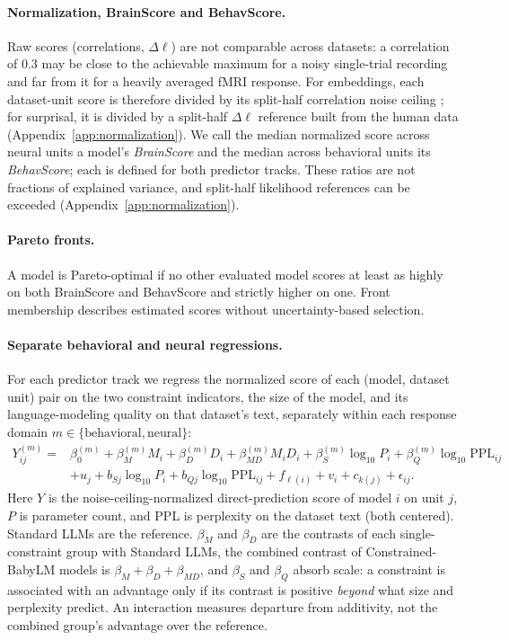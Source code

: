 \paragraph{Normalization, BrainScore and BehavScore.}
Raw scores (correlations, $\Delta\ell$) are not comparable across datasets: a correlation of 0.3 may be close to the achievable maximum for a noisy single-trial recording and far from it for a heavily averaged fMRI response. For embeddings, each dataset-unit score is therefore divided by its split-half correlation noise ceiling \citep{vanbree2025noiseceiling}; for surprisal, it is divided by a split-half $\Delta\ell$ reference built from the human data \citep{timkey2026dissociation} (Appendix~\ref{app:normalization}). We call the median normalized score across neural units a model's \emph{BrainScore} and the median across behavioral units its \emph{BehavScore}; each is defined for both predictor tracks. These ratios are not fractions of explained variance, and split-half likelihood references can be exceeded (Appendix~\ref{app:normalization}).

\paragraph{Pareto fronts.}
A model is Pareto-optimal if no other evaluated model scores at least as highly on both BrainScore and BehavScore and strictly higher on one. Front membership describes estimated scores without uncertainty-based selection.

\paragraph{Separate behavioral and neural regressions.}
For each predictor track we regress the normalized score of each (model, dataset unit) pair on the two constraint indicators, the size of the model, and its language-modeling quality on that dataset's text, separately within each response domain $m\in\{\mathrm{behavioral},\mathrm{neural}\}$:
\begin{align}
Y_{ij}^{(m)}={}&\beta_0^{(m)}+\beta_M^{(m)}M_i+\beta_D^{(m)}D_i+\beta_{MD}^{(m)}M_iD_i+\beta_S^{(m)}\log_{10}P_i+\beta_Q^{(m)}\log_{10}\mathrm{PPL}_{ij} \nonumber\\
&+u_j+b_{Sj}\log_{10}P_i+b_{Qj}\log_{10}\mathrm{PPL}_{ij}+f_{\ell(i)}+v_i+c_{k(j)}+\epsilon_{ij}.
\label{eq:group}
\end{align}
Here $Y$ is the noise-ceiling-normalized direct-prediction score of model $i$ on unit $j$, $P$ is parameter count, and PPL is perplexity on the dataset text (both centered). Standard LLMs are the reference. $\beta_M$ and $\beta_D$ are the contrasts of each single-constraint group with Standard LLMs, the combined contrast of Constrained-BabyLM models is $\beta_M+\beta_D+\beta_{MD}$, and $\beta_S$ and $\beta_Q$ absorb scale: a constraint is associated with an advantage only if its contrast is positive \emph{beyond} what size and perplexity predict. An interaction measures departure from additivity, not the combined group's advantage over the reference.

